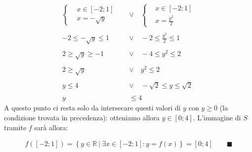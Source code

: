 \documentclass{article}
\newcommand*{\qed}{\blacksquare}
\newcommand*{\sys}[1]{\left\{\begin{aligned}#1\end{aligned}\right.}
\begin{document}
\[\begin{aligned}
    \sys{&x\in\left[-2;1\right]\\&x=-\sqrt{y}}
    \quad&\vee\quad
    \sys{&x\in\left[-2;1\right]\\&x=\frac{y^2}{2}}
    \\\:\\
    -2\le-\sqrt{y}\le1
    \quad&\vee\quad
    -2\le\frac{y^2}{2}\le1
    \\\:\\
    2\ge\sqrt{y}\ge-1
    \quad&\vee\quad
    -4\le y^2\le2
    \\\:\\
    2\ge\sqrt{y}
    \quad&\vee\quad
    y^2\le2
    \\\:\\
    y\le4
    \quad&\vee\quad
    -\sqrt{2}\le y\le\sqrt{2}
    \\\:\\
    y&\le 4
\end{aligned}\]
A questo punto ci resta solo da intersecare questi valori di $y$ con $y\ge0$
(la condizione trovata in precedenza): otteniamo allora $y\in\left[0;4\right]$.
L'immagine di $S$ tramite $f$ sarà allora:

\[\begin{aligned}
    f(\left[-2;1\right])
    = \left\{y\in\mathbb{R}\:|\:\exists x\in\left[-2;1\right]:y=f(x)\right\}
    = \left[0; 4\right]\qquad\qed
\end{aligned}\]
\end{document}

